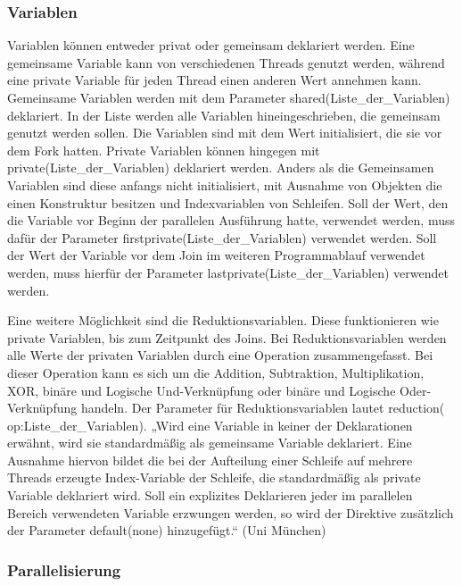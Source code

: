 \documentclass[../main.tex]{subfiles}
\begin{document}
\subsubsection{Variablen}

Variablen können entweder privat oder gemeinsam deklariert werden. Eine gemeinsame Variable kann von verschiedenen Threads genutzt werden, während eine private Variable für jeden Thread einen anderen Wert annehmen kann. Gemeinsame Variablen werden mit dem Parameter shared(Liste\_der\_Variablen) deklariert. In der Liste werden alle Variablen hineingeschrieben, die gemeinsam genutzt werden sollen. Die Variablen sind mit dem Wert initialisiert, die sie vor dem Fork hatten. Private Variablen können hingegen mit private(Liste\_der\_Variablen) deklariert werden.  Anders als die Gemeinsamen Variablen sind diese anfangs nicht initialisiert, mit Ausnahme von Objekten die einen Konstruktur besitzen und Indexvariablen von Schleifen.
Soll der Wert, den die Variable vor Beginn der parallelen Ausführung hatte, verwendet werden, muss dafür der Parameter firstprivate(Liste\_der\_Variablen) verwendet werden. Soll der Wert der Variable vor dem Join im weiteren Programmablauf verwendet werden, muss hierfür der Parameter lastprivate(Liste\_der\_Variablen) verwendet werden.

Eine weitere Möglichkeit sind die Reduktionsvariablen. Diese funktionieren wie private Variablen, bis zum Zeitpunkt des Joins. Bei Reduktionsvariablen werden alle Werte der privaten Variablen durch eine Operation zusammengefasst. Bei dieser Operation kann es sich um die Addition, Subtraktion, Multiplikation, XOR, binäre und Logische Und-Verknüpfung oder binäre und Logische Oder-Verknüpfung handeln. Der Parameter für Reduktionsvariablen lautet reduction( op:Liste\_der\_Variablen).
„Wird eine Variable in keiner der Deklarationen erwähnt, wird sie standardmäßig als gemeinsame Variable deklariert. Eine Ausnahme hiervon bildet die bei der Aufteilung einer Schleife auf mehrere Threads erzeugte Index-Variable der Schleife, die standardmäßig als private Variable deklariert wird. Soll ein explizites Deklarieren jeder im parallelen Bereich verwendeten Variable erzwungen werden, so wird der Direktive zusätzlich der Parameter default(none) hinzugefügt.“ (Uni München)

\subsubsection{Parallelisierung}
\end{document}
